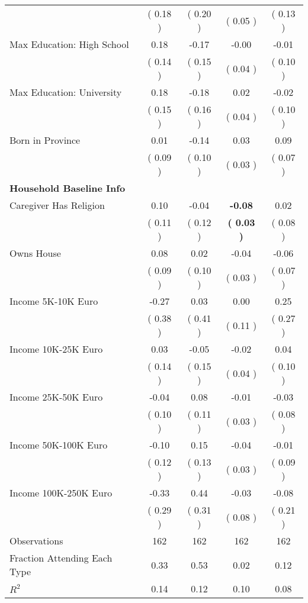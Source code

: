 \begin{table}[H]
{\begin{tabular}{lcccc}
\quad  & (     0.18 ) & (     0.20 )  & (     0.05 )  & (     0.13 )  \\
\quad Max Education: High School &      0.18 &     -0.17 &     -0.00 &     -0.01 \\
\quad  & (     0.14 ) & (     0.15 )  & (     0.04 )  & (     0.10 )  \\
\quad Max Education: University &      0.18 &     -0.18 &      0.02 &     -0.02 \\
\quad  & (     0.15 ) & (     0.16 )  & (     0.04 )  & (     0.10 )  \\
\quad Born in Province &      0.01 &     -0.14 &      0.03 &      0.09 \\
\quad  & (     0.09 ) & (     0.10 )  & (     0.03 )  & (     0.07 )  \\
\midrule
\textbf{Household Baseline Info} \\
\quad Caregiver Has Religion &      0.10 &     -0.04 & \textbf{    -0.08} &      0.02 \\
\quad  & (     0.11 ) & (     0.12 )  & \textbf{(     0.03 )}  & (     0.08 )  \\
\quad Owns House &      0.08 &      0.02 &     -0.04 &     -0.06 \\
\quad  & (     0.09 ) & (     0.10 )  & (     0.03 )  & (     0.07 )  \\
\quad Income 5K-10K Euro &     -0.27 &      0.03 &      0.00 &      0.25 \\
\quad  & (     0.38 ) & (     0.41 )  & (     0.11 )  & (     0.27 )  \\
\quad Income 10K-25K Euro &      0.03 &     -0.05 &     -0.02 &      0.04 \\
\quad  & (     0.14 ) & (     0.15 )  & (     0.04 )  & (     0.10 )  \\
\quad Income 25K-50K Euro &     -0.04 &      0.08 &     -0.01 &     -0.03 \\
\quad  & (     0.10 ) & (     0.11 )  & (     0.03 )  & (     0.08 )  \\
\quad Income 50K-100K Euro &     -0.10 &      0.15 &     -0.04 &     -0.01 \\
\quad  & (     0.12 ) & (     0.13 )  & (     0.03 )  & (     0.09 )  \\
\quad Income 100K-250K Euro &     -0.33 &      0.44 &     -0.03 &     -0.08 \\
\quad  & (     0.29 ) & (     0.31 )  & (     0.08 )  & (     0.21 )  \\
\midrule
Observations & 162 & 162 & 162 & 162 \\
Fraction Attending Each Type &      0.33 &      0.53 &      0.02 &      0.12 \\
\midrule
$ R^2$ &      0.14 &      0.12 &      0.10 &      0.08 \\
\bottomrule
\end{tabular}}
\end{table}
